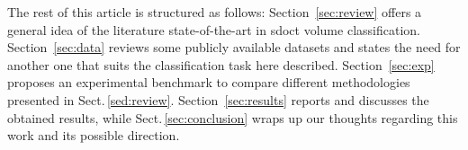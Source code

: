  The rest of this article is structured as follows: Section~\ref{sec:review} offers a general idea of the literature state-of-the-art in \gls{sdoct} volume classification. Section~\ref{sec:data} reviews some publicly available datasets and states the need for another one that suits the classification task here described.
 Section~\ref{sec:exp} proposes an experimental benchmark to compare different methodologies presented in Sect.\,\ref{sed:review}.
 Section~\ref{sec:results} reports and discusses the obtained results, while Sect.\,\ref{sec:conclusion} wraps up our thoughts regarding this work and its possible direction.


